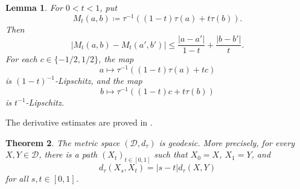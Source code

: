 \documentclass[10pt,a4paper]{amsart}
\newtheorem{theorem}{Theorem}[section]
\newtheorem{lemma}[theorem]{Lemma}
\newcommand{\D}{\mathcal D}
\newcommand{\dtau}{d_{\tau}}
\begin{document}
\begin{lemma}
\label{lem:scalar-interpolation}
For $0<t<1$, put
\[
M_t(a,b)\coloneqq\tau^{-1}((1-t)\tau(a)+t\tau(b)).
\]
Then
\[
|M_t(a,b)-M_t(a',b')|
\leq\frac{|a-a'|}{1-t}+\frac{|b-b'|}{t}.
\]
For each $c\in\{-1/2,1/2\}$, the map
\[
a\longmapsto\tau^{-1}((1-t)\tau(a)+tc)
\]
is $(1-t)^{-1}$-Lipschitz, and the map
\[
b\longmapsto\tau^{-1}((1-t)c+t\tau(b))
\]
is $t^{-1}$-Lipschitz.
\end{lemma}

The derivative estimates are proved in .

\begin{theorem}
\label{thm:dtau-geodesic}
The metric space $(\D,\dtau)$ is geodesic. More precisely, for every $X,Y\in\D$, there is a path $(X_t)_{t\in[0,1]}$ such that $X_0=X$, $X_1=Y$, and
\[
\dtau(X_s,X_t)=|s-t|\dtau(X,Y)
\]
for all $s,t\in[0,1]$.
\end{theorem}
\end{document}

